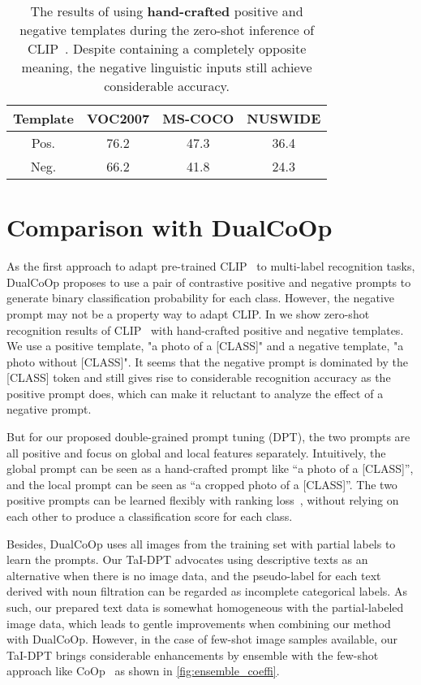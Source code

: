 \documentclass[10pt,twocolumn,letterpaper]{article}
\begin{document}
\begin{table}
    \centering
    \caption{The results of using \textbf{hand-crafted} positive and negative templates during the zero-shot inference of CLIP~\cite{clip}. Despite containing a completely opposite meaning, the negative linguistic inputs still achieve considerable accuracy.}
    \vspace{-2mm}
    \setlength{\tabcolsep}{3mm}
    \begin{tabular}{c|ccc}
    \toprule
Template & VOC2007 & MS-COCO & NUSWIDE  \\ \hline
Pos. & 76.2 & 47.3 & 36.4  \\ 
Neg. & 66.2 & 41.8 & 24.3  \\ 
    \bottomrule
    \end{tabular}
  \label{tab:neg}
\end{table}

\section{Comparison with DualCoOp}
\label{sec:dualcoop}
As the first approach to adapt pre-trained CLIP~\cite{clip} to multi-label recognition tasks, DualCoOp\cite{dualcoop} proposes to use a pair of contrastive positive and negative prompts to generate binary classification probability for each class. However, the negative prompt may not be a property way to adapt CLIP. In  we show zero-shot recognition results of CLIP~\cite{clip} with hand-crafted positive and negative templates. We use a positive template, "a photo of a [CLASS]" and a negative template, "a photo without [CLASS]". It seems that the negative prompt is dominated by the [CLASS] token and still gives rise to considerable recognition accuracy as the positive prompt does, which can make it reluctant to analyze the effect of a negative prompt.

But for our proposed double-grained prompt tuning (DPT), the two prompts are all positive and focus on global and local features separately. Intuitively, the global prompt can be seen as a hand-crafted prompt like ``a photo of a [CLASS]'', and the local prompt can be seen as ``a cropped photo of a [CLASS]''. The two positive prompts can be learned flexibly with ranking loss~\cite{rankingloss}, without relying on each other to produce a classification score for each class. 

Besides, DualCoOp\cite{dualcoop} uses all images from the training set with partial labels to learn the prompts. Our TaI-DPT advocates using descriptive texts as an alternative when there is no image data, and the pseudo-label for each text derived with noun filtration can be regarded as incomplete categorical labels. As such, our prepared text data is somewhat homogeneous with the partial-labeled image data, which leads to gentle improvements when combining our method with DualCoOp. However, in the case of few-shot image samples available, our TaI-DPT brings considerable enhancements by ensemble with the few-shot approach like CoOp~\cite{coop} as shown in \cref{fig:ensemble_coeffi}.
\end{document}
